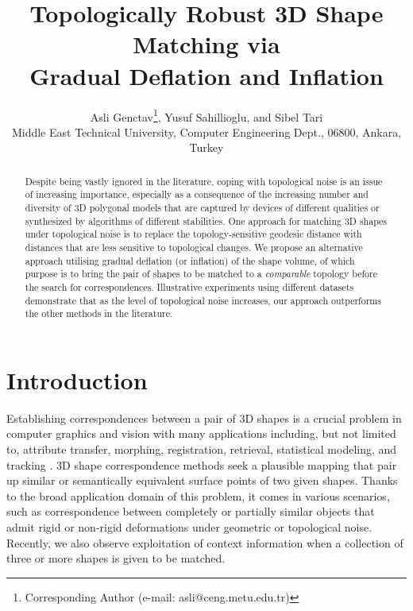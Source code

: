 \documentclass{egpubl}
\title[Topologically Robust 3D Shape Matching via Gradual Deflation and Inflation]%
      {Topologically Robust 3D Shape Matching via\\ Gradual Deflation and Inflation}
\author[A. Genctav \& Y. Sahillioglu \& S. Tari]
       {Asli Genctav\thanks{Corresponding Author (e-mail: asli@ceng.metu.edu.tr)}, Yusuf Sahillioglu,
        and Sibel Tari
        \\
         Middle East Technical University, Computer Engineering Dept., 06800, Ankara, Turkey\\     
       }
\begin{document}

\maketitle

\begin{abstract}

Despite being vastly ignored in the literature, coping with topological noise is an issue of increasing importance, especially as a consequence of the increasing number and diversity of 3D polygonal models that are captured by devices of different qualities or synthesized by algorithms of different stabilities.  One approach for matching 3D shapes under topological noise is to replace the topology-sensitive geodesic distance with distances that are less sensitive to topological changes.  We propose an alternative approach utilising gradual deflation (or inflation) of the shape volume, of which purpose is to bring the pair of shapes to be matched to a \emph{comparable} topology before the search for correspondences. Illustrative experiments using different datasets demonstrate that as the level of topological noise increases, our approach outperforms the other methods in the literature. 
  

\end{abstract}





\section{Introduction}

Establishing correspondences between a pair of 3D shapes is a crucial problem in computer graphics and vision with many applications including, but not limited to, attribute transfer, morphing, registration, retrieval, statistical modeling, and tracking \cite{Bronstein08, Kaick11}. 3D shape correspondence methods seek a plausible mapping that pair up similar or semantically equivalent surface points of two given shapes. Thanks to the broad application domain of this problem, it comes in various scenarios, such as correspondence between completely or partially similar objects that admit rigid or non-rigid deformations under geometric or topological noise. Recently, we also observe exploitation of context information when a collection of three or more shapes is given to be matched.
\end{document}
